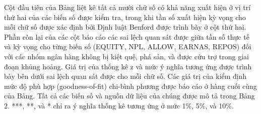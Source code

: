 Cột đầu tiên của Bảng liệt kê tất cả mười chữ số có khả năng xuất hiện ở vị trí thứ hai của các biến số được kiểm tra, trong khi tần số xuất hiện kỳ vọng cho mỗi chữ số được xác định bởi Định luật Benford được trình bày ở cột thứ hai. Phần còn lại của các cột báo cáo các sai lệch quan sát được giữa tần số thực tế và kỳ vọng cho từng biến số (EQUITY, NPL, ALLOW, EARNAS, REPOS) đối với các nhóm ngân hàng không bị kiệt quệ, phá sản, và được cứu trợ trong giai đoạn khủng hoảng. Giá trị của thống kê z và mức ý nghĩa tương ứng được trình bày bên dưới sai lệch quan sát được cho mỗi chữ số. Các giá trị của kiểm định mức độ phù hợp (goodness-of-fit) chi-bình phương được báo cáo ở hàng cuối cùng của Bảng. Tất cả các biến số và nguồn dữ liệu của chúng được mô tả trong Bảng 2. ***, **, và * chỉ ra ý nghĩa thống kê tương ứng ở mức 1\%, 5\%, và 10\%.

